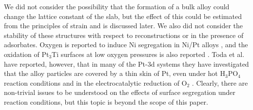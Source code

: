 \documentclass[aps,preprint,superscriptaddress,endfloats*]{revtex4}
\begin{document}
We did not consider the possibility that the formation of a bulk alloy
could change the lattice constant of the slab, but the effect of this
could be estimated from the principles of strain
\cite{mavrikakis1998:_effec_strain_metal} and is discussed later.  We
also did not consider the stability of these structures with respect
to reconstructions or in the presence of adsorbates.  Oxygen is
reported to induce Ni segregation in Ni/Pt alloys \cite{weigand1992},
and the oxidation of Pt$_3$Ti surfaces at low oxygen pressures is also
reported \cite{bardi1984}.  Toda et al. have reported, however, that
in many of the Pt-3d systems they have investigated that the alloy
particles are covered by a thin skin of Pt, even under hot H$_3$PO$_4$
reaction conditions and in the electrocatalytic reduction of O$_2$
\cite{toda1999}.  Clearly, there are non-trivial issues to be
understood on the effects of surface segregation under reaction
conditions, but this topic is beyond the scope of this paper.
\end{document}
